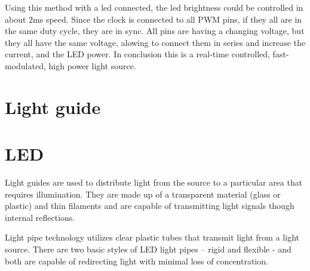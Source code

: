 \documentclass[\main/master.tex]{subfiles}
\begin{document}
\par
Using this method with a led connected, the led brightness could be controlled in about 2ms speed. Since the clock is connected to all PWM pins, if they all are in the same duty cycle, they are in sync. All pins are having a changing voltage, but they all have the same voltage, alowing to connect them in series and increase the current, and the LED power. In conclusion this is a real-time controlled, fast-modulated, high power light source. 
\section{Light guide}
\section{LED}
\color{blue}
\par
Light guides are used to distribute light from the source to a particular area that requires illumination. They are made up of a transparent material (glass or plastic) and thin filaments and are capable of transmitting light signals though internal reflections.  

Light pipe technology utilizes clear plastic tubes that transmit light from a light source. There are two basic styles of LED light pipes – rigid and flexible - and both are capable of redirecting light with minimal loss of concentration.
\end{document}
